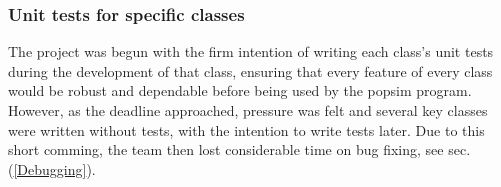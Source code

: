 \subsubsection{Unit tests for specific classes}
The project was begun with the firm intention of writing each class's unit tests during the development of that class, ensuring that every feature of every class would be robust and dependable before being used by the popsim program.  However, as the deadline approached, pressure was felt and several key classes were written without tests, with the intention to write tests later.
Due to this short comming, the team then lost considerable time on bug fixing, see sec.(\ref{Debugging}).


%

